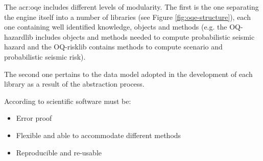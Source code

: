 The \gls{acr:oqe} includes different levels of modularity. The first is the one separating the engine itself into a number of libraries (see Figure \ref{fig:oqe-structure}), each one containing well identified knowledge, objects and methods (e.g. the OQ-hazardlib  includes objects and methods needed to compute probabilistic seismic hazard and the OQ-risklib contains methods to compute scenario and probabilistic seismic risk).

The second one pertains to the data model adopted in the development of each library as a result of the abstraction process.

According to \citet{berkes2012} scientific software must be:
\begin{itemize}
\item Error proof
\item Flexible and able to accommodate different methods
\item Reproducible and re-usable
\end{itemize}